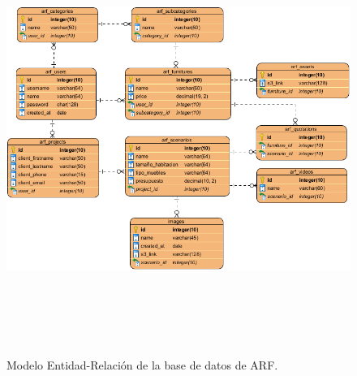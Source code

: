 \begin{figure}[H]
	\centering
	\includegraphics[width=16cm,height=14cm]{imagenes/desarrollo/arquitectura/ERD.png}
	\caption{Modelo Entidad-Relación de la base de datos de ARF.}
	\label{fig:erd}
\end{figure}

\clearpage